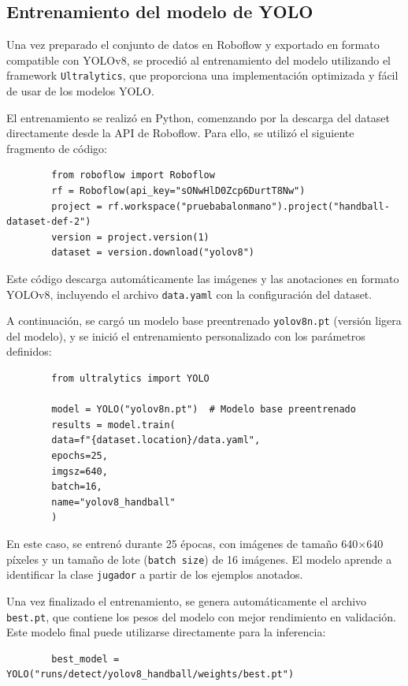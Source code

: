 \documentclass[12pt, a4paper, twoside]{article}
\begin{document}
	
	\subsection{Entrenamiento del modelo de YOLO}
	
	Una vez preparado el conjunto de datos en Roboflow y exportado en formato compatible con YOLOv8, se procedió al entrenamiento del modelo utilizando el framework \texttt{Ultralytics}, que proporciona una implementación optimizada y fácil de usar de los modelos YOLO.
	
	El entrenamiento se realizó en Python, comenzando por la descarga del dataset directamente desde la API de Roboflow. Para ello, se utilizó el siguiente fragmento de código:
	
	\begin{verbatim}
		from roboflow import Roboflow
		rf = Roboflow(api_key="sONwHlD0Zcp6DurtT8Nw")
		project = rf.workspace("pruebabalonmano").project("handball-dataset-def-2")
		version = project.version(1)
		dataset = version.download("yolov8")
	\end{verbatim}
	
	Este código descarga automáticamente las imágenes y las anotaciones en formato YOLOv8, incluyendo el archivo \texttt{data.yaml} con la configuración del dataset.
	
	A continuación, se cargó un modelo base preentrenado \texttt{yolov8n.pt} (versión ligera del modelo), y se inició el entrenamiento personalizado con los parámetros definidos:
	
	\begin{verbatim}
		from ultralytics import YOLO
		
		model = YOLO("yolov8n.pt")  # Modelo base preentrenado
		results = model.train(
		data=f"{dataset.location}/data.yaml",
		epochs=25,
		imgsz=640,
		batch=16,
		name="yolov8_handball"
		)
	\end{verbatim}
	
	En este caso, se entrenó durante 25 épocas, con imágenes de tamaño 640×640 píxeles y un tamaño de lote (\texttt{batch size}) de 16 imágenes. El modelo aprende a identificar la clase \texttt{jugador} a partir de los ejemplos anotados.
	
	Una vez finalizado el entrenamiento, se genera automáticamente el archivo \texttt{best.pt}, que contiene los pesos del modelo con mejor rendimiento en validación. Este modelo final puede utilizarse directamente para la inferencia:
	
	\begin{verbatim}
		best_model = YOLO("runs/detect/yolov8_handball/weights/best.pt")
	\end{verbatim}
	
\end{document}
